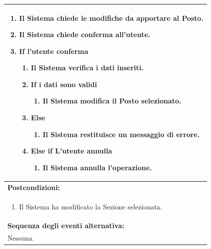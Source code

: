 \documentclass{article}
\begin{document}
\begin{table}[H]
\begin{tabular}{|p{\linewidth}|}
\begin{enumerate}
                            \item Il Sistema chiede le modifiche da apportare al Posto.
                            \item Il Sistema chiede conferma all'utente.
                            \item \textbf{If} l'utente conferma
                            \begin{enumerate}
                                \item Il Sistema verifica i dati inseriti.
                                \item \textbf{If} i dati sono validi
                                \begin{enumerate}
                                    \item Il Sistema modifica il Posto selezionato.
                                \end{enumerate}
                                \item \textbf{Else}
                                \begin{enumerate}
                                    \item Il Sistema restituisce un messaggio di errore.
                                \end{enumerate}
                                \item \textbf{Else if} L'utente annulla
                                \begin{enumerate}
                                    \item Il Sistema annulla l'operazione.
                                \end{enumerate}
                            \end{enumerate}
                            
                        \end{enumerate} \\
                        \hline
                        \cellcolor{gray!20}
                        \textbf{Postcondizioni:} \\
                        \cellcolor{gray!20}
                        \begin{minipage}{\linewidth}
                            \begin{enumerate}
                                \item Il Sistema ha modificato la Sezione selezionata.
                            \end{enumerate}
                        \end{minipage} \\
                        \hline
                        \textbf{Sequenza degli eventi alternativa:} \\
                        Nessuna. \\
                        \hline
                    \end{tabular}
                \end{table}
                
\end{document}
